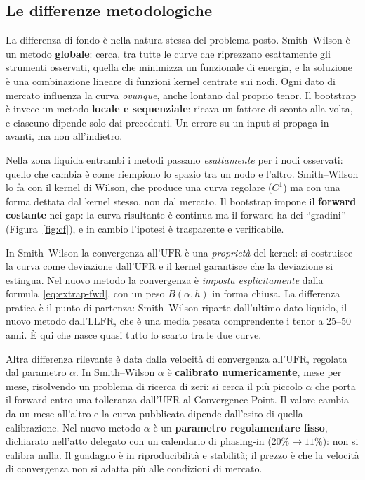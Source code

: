 \documentclass[11pt,a4paper]{article}
\theoremstyle{plain}
\theoremstyle{definition}
\theoremstyle{remark}
\newcommand{\UFR}{\mathrm{UFR}}
\newcommand{\LLFR}{\mathrm{LLFR}}
\begin{document}
\subsection{Le differenze metodologiche}


La differenza di fondo \`e nella natura stessa del problema posto. Smith--Wilson \`e un metodo
\textbf{globale}: cerca, tra tutte le curve che riprezzano esattamente gli strumenti osservati,
quella che minimizza un funzionale di energia, e la soluzione \`e una combinazione lineare di
funzioni kernel centrate sui nodi. Ogni dato di mercato influenza la curva \emph{ovunque},
anche lontano dal proprio tenor. Il bootstrap \`e invece un metodo \textbf{locale e
sequenziale}: ricava un fattore di sconto alla volta, e ciascuno dipende solo dai precedenti.
Un errore su un input si propaga in avanti, ma non all'indietro.


Nella zona liquida entrambi i metodi passano \emph{esattamente} per i nodi osservati: quello
che cambia \`e come riempiono lo spazio tra un nodo e l'altro. Smith--Wilson lo fa con il
kernel di Wilson, che produce una curva regolare ($C^1$) ma con una forma dettata dal kernel
stesso, non dal mercato. Il bootstrap impone il \textbf{forward costante} nei gap: la curva
risultante \`e continua ma il forward ha dei ``gradini'' (Figura~\ref{fig:cf}), e in cambio
l'ipotesi \`e trasparente e verificabile.


In Smith--Wilson la convergenza all'$\UFR$ \`e una \emph{propriet\`a} del kernel: si costruisce
la curva come deviazione dall'$\UFR$ e il kernel garantisce che la deviazione si estingua.
Nel nuovo metodo la convergenza \`e \emph{imposta esplicitamente} dalla
formula~\eqref{eq:extrap-fwd}, con un peso $B(\alpha,h)$ in forma chiusa. La differenza
pratica \`e il punto di partenza: Smith--Wilson riparte dall'ultimo dato liquido, il nuovo
metodo dall'$\LLFR$, che \`e una media pesata comprendente i tenor a 25--50 anni. \`E qui che
nasce quasi tutto lo scarto tra le due curve.

Altra differenza rilevante è data dalla velocità di convergenza all'$\UFR$, regolata dal parametro $\alpha$.
 In Smith--Wilson $\alpha$ \`e
\textbf{calibrato numericamente}, mese per mese, risolvendo un problema di ricerca di zeri:
si cerca il pi\`u piccolo $\alpha$ che porta il forward entro una tolleranza dall'$\UFR$ al
Convergence Point. Il valore cambia da un mese all'altro e la curva pubblicata dipende
dall'esito di quella calibrazione. Nel nuovo metodo $\alpha$ \`e un \textbf{parametro
regolamentare fisso}, dichiarato nell'atto delegato con un calendario di phasing-in
($20\%\to11\%$): non si calibra nulla. Il guadagno \`e in riproducibilit\`a e stabilit\`a; il
prezzo \`e che la velocit\`a di convergenza non si adatta pi\`u alle condizioni di mercato.
\end{document}
